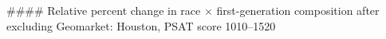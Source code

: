 #### Relative percent change in race × first-generation composition after excluding Geomarket: Houston, PSAT score 1010–1520
